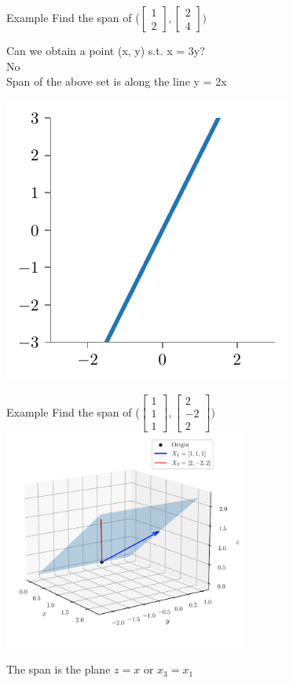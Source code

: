 \documentclass{beamer}
\begin{document}
\begin{frame}{Example}
Find the span of ($\begin{bmatrix}
1 \\2
\end{bmatrix}, \begin{bmatrix}
2 \\4
\end{bmatrix}) $

\pause Can we obtain a point (x, y) s.t. x = 3y? \\
\pause No \\ 
\pause Span of the above set is along the line y = 2x

\includegraphics[scale=0.6]{../assets/linear-regression/figures/geoemetric-span-4.pdf}


\end{frame}

\begin{frame}{Example}
Find the span of ($\begin{bmatrix}
1 \\1\\1
\end{bmatrix}, \begin{bmatrix}
2 \\-2\\2
\end{bmatrix}) $
\pause 
    \includegraphics[width=0.6\textwidth]{../assets/linear-regression/figures/geometric-1.pdf}


\pause The span is the plane $z=x$ or $x_3=x_1$
\end{frame}
\end{document}

